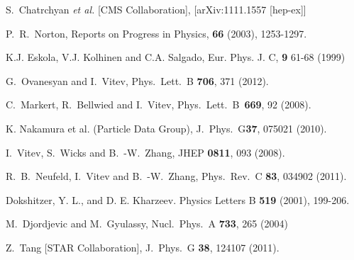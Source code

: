 \documentclass[article,showpacs,preprintnumbers,amsmath,amssymb]{revtex4}
\begin{document}
\begin{thebibliography}{80}
  S.~Chatrchyan {\it et al.}  [CMS Collaboration],
  [arXiv:1111.1557 [hep-ex]]


{P.~R.~{Norton}},
{Reports on Progress in Physics}, {\bf{66}} (2003), {1253-1297}.

K.J. Eskola, V.J. Kolhinen and C.A. Salgado, 
Eur. Phys. J. C, {\bf{9}} 61-68 (1999) 

  G.~Ovanesyan and I.~Vitev,
  Phys.\ Lett.\  B {\bf 706}, 371 (2012).

  C.~Markert, R.~Bellwied and I.~Vitev,
  Phys.\ Lett.\ B\ {\bf 669}, 92  (2008).

 K. Nakamura et al. (Particle Data Group), J.\ Phys.\ G{\bf37}, 075021 (2010).

  I.~Vitev, S.~Wicks and B.~-W.~Zhang,
  JHEP {\bf 0811}, 093 (2008).


  R.~B.~Neufeld, I.~Vitev and B.~-W.~Zhang,
  Phys.\ Rev.\ C {\bf 83}, 034902 (2011).

 Dokshitzer, Y. L., and D. E. Kharzeev. 
 Physics Letters B {\bf{519}} (2001), {199-206}.

  M.~Djordjevic and M.~Gyulassy,
  Nucl.\ Phys.\ A {\bf 733}, 265 (2004)

  Z.~Tang  [STAR Collaboration],
  J.\ Phys.\ G {\bf 38}, 124107 (2011).


\end{thebibliography}
\end{document}
